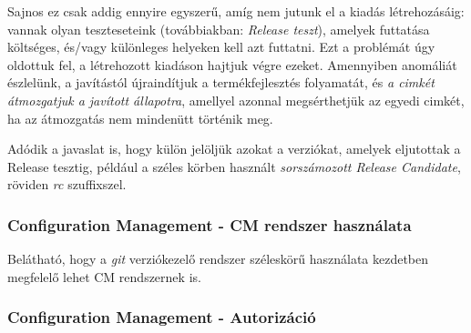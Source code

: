 Sajnos ez csak addig ennyire egyszerű, amíg nem jutunk el a kiadás létrehozásáig:
vannak olyan teszteseteink (továbbiakban: \emph{Release teszt}),
amelyek futtatása költséges, és/vagy különleges helyeken kell azt
futtatni. Ezt a problémát úgy oldottuk fel, a létrehozott kiadáson hajtjuk végre ezeket.
Amennyiben anomáliát észlelünk, a javítástól újraindítjuk a termékfejlesztés folyamatát,
és \emph{a cimkét átmozgatjuk a javított állapotra}, amellyel azonnal megsérthetjük az egyedi
cimkét, ha az átmozgatás nem mindenütt történik meg.

Adódik a javaslat is, hogy külön jelöljük azokat a verziókat, amelyek eljutottak a Release tesztig,
például a széles körben használt \emph{sorszámozott Release Candidate}, röviden \emph{rc} szuffixszel.

\subsubsection{Configuration Management - CM rendszer használata}
Belátható, hogy a \emph{git} verziókezelő rendszer széleskörű használata kezdetben megfelelő
lehet CM rendszernek is.

\subsubsection{Configuration Management - Autorizáció}
